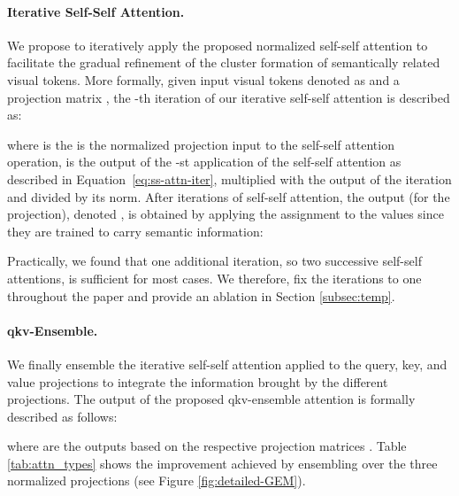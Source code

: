 \documentclass[10pt,twocolumn,letterpaper]{article}
\begin{document}
\paragraph{Iterative Self-Self Attention.}
We propose to iteratively apply the proposed normalized self-self attention to facilitate the gradual refinement of the cluster formation of semantically related visual tokens.
More formally, given input visual tokens denoted as  and a projection matrix , the -th iteration of our iterative self-self attention is described as:

where  is the is the normalized projection input to the self-self attention operation,  is the output of the -st application of the self-self attention as described in Equation~\ref{eq:ss-attn-iter}, multiplied with the output of the  iteration and divided by its norm. 
After  iterations of self-self attention, the output (for the  projection), denoted , is obtained by applying the assignment to the values since they are trained to carry semantic information: 

Practically, we found that one additional iteration, so two successive self-self attentions, is sufficient for most cases. We therefore, fix the iterations to one throughout the paper and provide an ablation in Section \ref{subsec:temp}.

\paragraph{qkv-Ensemble.}
We finally ensemble the iterative self-self attention applied to the query, key, and value projections to integrate the information brought by the different projections. 
The output  of the proposed qkv-ensemble attention is formally described as follows:

where  are the outputs based on the respective projection matrices .
Table \ref{tab:attn_types} shows the improvement achieved by ensembling over the three normalized projections (see Figure \ref{fig:detailed-GEM}). 
\end{document}
